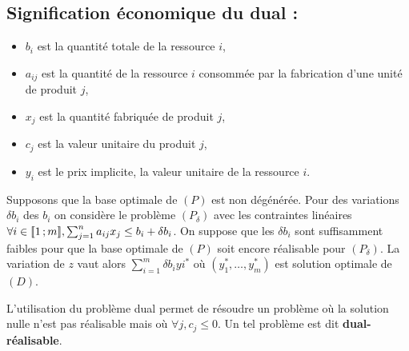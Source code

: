 \subsection{Signification économique du dual :}

	\begin{itemize}
		\item[\textbullet] $b_i$ est la quantité totale de la ressource $i$,
		\item[\textbullet] $a_{ij}$ est la quantité de la ressource $i$ consommée par la fabrication d'une unité de produit $j$,
		\item[\textbullet] $x_j$ est la quantité fabriquée de produit $j$,
		\item[\textbullet] $c_j$ est la valeur unitaire du produit $j$,
		\item[\textbullet] $y_i$ est le prix implicite, la valeur unitaire de la ressource $i$.
	\end{itemize}

	\begin{thm}
		Supposons que la base optimale de $(P)$ est non dégénérée.
		Pour des variations $\delta b_i$ des $b_i$ on considère le problème $(P_\delta)$ avec les contraintes linéaires $\forall i \in \mathopen{[\![}1\mathclose{}\mathpunct{};m\mathclose{]\!]}, \sum_{j = 1}^n a_{ij} x_j \leq b_i + \delta b_i$.
		On suppose que les $\delta b_i$ sont suffisamment faibles pour que la base optimale de $(P)$ soit encore réalisable pour $(P_\delta)$.
		La variation de $z$ vaut alors $\sum_{i = 1}^m \delta b_i yi^*$ où $(y_1^*, \ldots, y_m^*)$ est solution optimale de $(D)$.
	\end{thm}

L'utilisation du problème dual permet de résoudre un problème où la solution nulle n'est pas réalisable mais où $\forall j, c_j \leq 0$.
Un tel problème est dit \textbf{dual-réalisable}.
